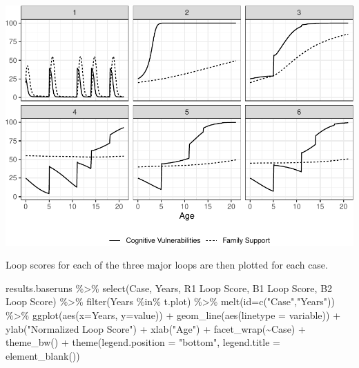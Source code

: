 \documentclass[
]{article}
\newenvironment{Shaded}{\begin{snugshade}}{\end{snugshade}}
\newcommand{\AttributeTok}[1]{\textcolor[rgb]{0.77,0.63,0.00}{#1}}
\newcommand{\FunctionTok}[1]{\textcolor[rgb]{0.00,0.00,0.00}{#1}}
\newcommand{\NormalTok}[1]{#1}
\newcommand{\SpecialCharTok}[1]{\textcolor[rgb]{0.00,0.00,0.00}{#1}}
\newcommand{\StringTok}[1]{\textcolor[rgb]{0.31,0.60,0.02}{#1}}
\begin{document}
\includegraphics{Study-1_files/figure-latex/plot each case using ggplot2-1.pdf}

Loop scores for each of the three major loops are then plotted for each
case.

\begin{Shaded}
\begin{Highlighting}[]
\NormalTok{results.baseruns }\SpecialCharTok{\%\textgreater{}\%} 
  \FunctionTok{select}\NormalTok{(Case, Years, }\StringTok{\textasciigrave{}}\AttributeTok{R1 Loop Score}\StringTok{\textasciigrave{}}\NormalTok{, }\StringTok{\textasciigrave{}}\AttributeTok{B1 Loop Score}\StringTok{\textasciigrave{}}\NormalTok{, }\StringTok{\textasciigrave{}}\AttributeTok{B2 Loop Score}\StringTok{\textasciigrave{}}\NormalTok{) }\SpecialCharTok{\%\textgreater{}\%}
  \FunctionTok{filter}\NormalTok{(Years }\SpecialCharTok{\%in\%}\NormalTok{ t.plot) }\SpecialCharTok{\%\textgreater{}\%}
  \FunctionTok{melt}\NormalTok{(}\AttributeTok{id=}\FunctionTok{c}\NormalTok{(}\StringTok{"Case"}\NormalTok{,}\StringTok{"Years"}\NormalTok{)) }\SpecialCharTok{\%\textgreater{}\%} 
    \FunctionTok{ggplot}\NormalTok{(}\FunctionTok{aes}\NormalTok{(}\AttributeTok{x=}\NormalTok{Years, }\AttributeTok{y=}\NormalTok{value)) }\SpecialCharTok{+}
    \FunctionTok{geom\_line}\NormalTok{(}\FunctionTok{aes}\NormalTok{(}\AttributeTok{linetype =}\NormalTok{ variable)) }\SpecialCharTok{+}
    \FunctionTok{ylab}\NormalTok{(}\StringTok{"Normalized Loop Score"}\NormalTok{) }\SpecialCharTok{+} 
    \FunctionTok{xlab}\NormalTok{(}\StringTok{"Age"}\NormalTok{) }\SpecialCharTok{+} 
    \FunctionTok{facet\_wrap}\NormalTok{(}\SpecialCharTok{\textasciitilde{}}\NormalTok{Case) }\SpecialCharTok{+}
    \FunctionTok{theme\_bw}\NormalTok{() }\SpecialCharTok{+} 
    \FunctionTok{theme}\NormalTok{(}\AttributeTok{legend.position =} \StringTok{"bottom"}\NormalTok{, }
          \AttributeTok{legend.title =} \FunctionTok{element\_blank}\NormalTok{())}
\end{Highlighting}
\end{Shaded}
\end{document}
